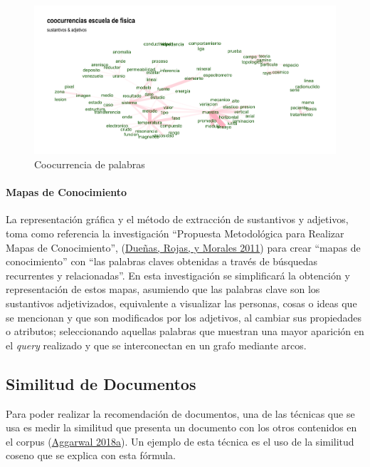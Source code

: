 \documentclass[
  12pt,
  openany]{book}
\begin{document}
\begin{figure}

{\centering \includegraphics[width=0.9\linewidth]{images/03-marco-teorico/cooc} 

}

\caption{Coocurrencia de palabras}\label{fig:coocejem}
\end{figure}

\hypertarget{mapacon}{%
\paragraph{Mapas de Conocimiento}\label{mapacon}}

La representación gráfica y el método de extracción de sustantivos y adjetivos, toma como referencia la investigación ``Propuesta Metodológica para Realizar Mapas de Conocimiento'', (\protect\hyperlink{ref-dueuxf1as2011}{Dueñas, Rojas, y Morales 2011}) para crear ``mapas de conocimiento'' con ``las palabras claves obtenidas a través de búsquedas recurrentes y relacionadas''. En esta investigación se simplificará la obtención y representación de estos mapas, asumiendo que las palabras clave son los sustantivos adjetivizados, equivalente a visualizar las personas, cosas o ideas que se mencionan y que son modificados por los adjetivos, al cambiar sus propiedades o atributos; seleccionando aquellas palabras que muestran una mayor aparición en el \emph{query} realizado y que se interconectan en un grafo mediante arcos.

\hypertarget{similitud}{%
\subsection{Similitud de Documentos}\label{similitud}}

Para poder realizar la recomendación de documentos, una de las técnicas que se usa es medir la similitud que presenta un documento con los otros contenidos en el corpus (\protect\hyperlink{ref-aggarwal2018a}{Aggarwal 2018a}). Un ejemplo de esta técnica es el uso de la similitud coseno que se explica con esta fórmula.
\end{document}

